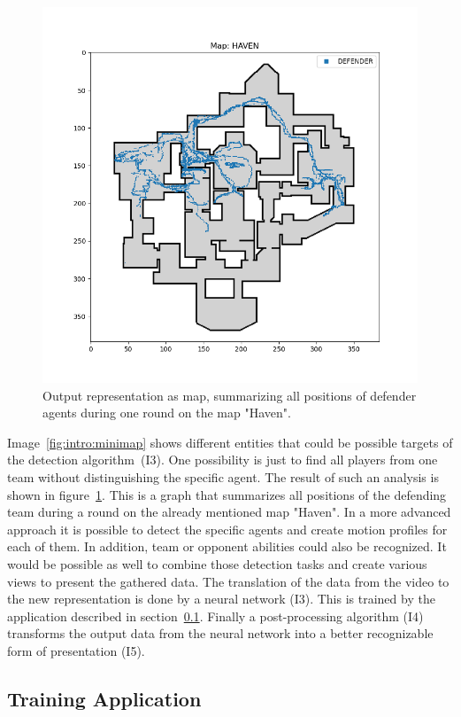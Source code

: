 \begin{figure}
	\centering
	\includegraphics[width=0.8\linewidth]{images/05-output}
	\caption[Output representation as map.]{Output representation as map, summarizing all positions 
	of defender agents during one round on the map "Haven".}
	\label{fig:app:output}
\end{figure}

Image~\ref{fig:intro:minimap} shows different entities that could be possible targets of the detection 
algorithm~(I3). One possibility is just to find all players from one team without distinguishing the 
specific agent. The result of such an analysis is shown in figure~\ref{fig:app:output}. This is a graph 
that summarizes all positions of the defending team during a round on the already mentioned map 
"Haven". In a more advanced approach it is possible to detect the specific agents and create motion 
profiles for each of them. In addition, team or opponent abilities could also be recognized. It would 
be possible as well to combine those detection tasks and create various views to present the 
gathered data. The translation of the data from the video to the new representation is done by a 
neural network (I3). This is trained by the application described in section~\ref{subsec:app:training}. 
Finally a post-processing algorithm (I4) transforms the output data from the neural network into a 
better recognizable form of presentation (I5).

\subsection{Training Application}\label{subsec:app:training}

